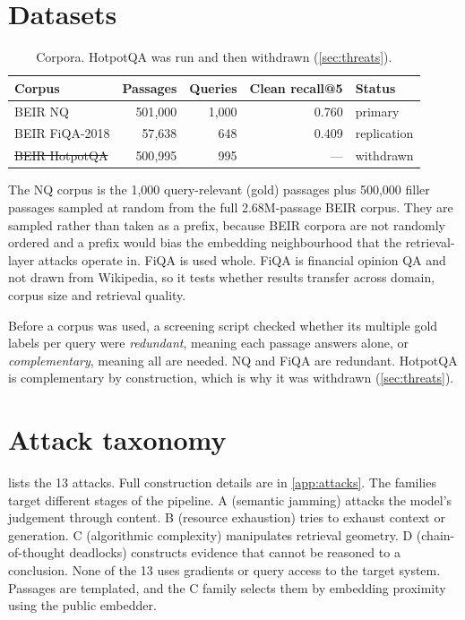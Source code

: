 \section{Datasets}
\label{sec:datasets}

\begin{table}[ht]
\centering
\small
\caption{Corpora. HotpotQA was run and then withdrawn (\cref{sec:threats}).}
\label{tab:datasets}
\begin{tabular}{@{}lrrrl@{}}
\toprule
Corpus & Passages & Queries & Clean recall@5 & Status \\
\midrule
BEIR NQ \cite{kwiatkowski2019nq,thakur2021beir} & 501{,}000 & 1{,}000 & 0.760 & primary \\
BEIR FiQA-2018 \cite{maia2018fiqa}               & 57{,}638  & 648     & 0.409 & replication \\
\sout{BEIR HotpotQA} \cite{yang2018hotpotqa}     & 500{,}995 & 995     & ---   & withdrawn \\
\bottomrule
\end{tabular}
\end{table}

The NQ corpus is the 1{,}000 query-relevant (gold) passages plus 500{,}000
filler passages sampled at random from the full 2.68M-passage BEIR corpus.
They are sampled rather than taken as a prefix, because BEIR corpora are not
randomly ordered and a prefix would bias the embedding neighbourhood that the
retrieval-layer attacks operate in. FiQA is used whole. FiQA is financial
opinion QA and not drawn from Wikipedia, so it tests whether results transfer
across domain, corpus size and retrieval quality.

Before a corpus was used, a screening script checked whether its multiple gold
labels per query were \emph{redundant}, meaning each passage answers alone, or
\emph{complementary}, meaning all are needed. NQ and FiQA are redundant.
HotpotQA is complementary by construction, which is why it was withdrawn
(\cref{sec:threats}).

\section{Attack taxonomy}
\label{sec:attacks}

 lists the 13 attacks. Full construction details are in
\cref{app:attacks}. The families target different stages of the pipeline. A
(semantic jamming) attacks the model's judgement through content. B (resource
exhaustion) tries to exhaust context or generation. C (algorithmic complexity)
manipulates retrieval geometry. D (chain-of-thought deadlocks) constructs
evidence that cannot be reasoned to a conclusion. None of the 13
uses gradients or query access to the target system. Passages are templated,
and the C family selects them by embedding proximity using the public
embedder.

